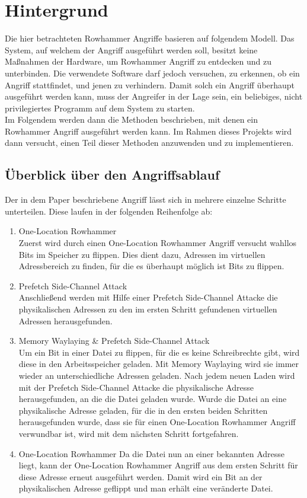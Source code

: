\documentclass[conference]{IEEEtran}
\begin{document}
\section{Hintergrund}\label{sec:background}
Die hier betrachteten Rowhammer Angriffe basieren auf folgendem Modell. Das System, auf welchem der Angriff ausgeführt werden soll, besitzt keine Maßnahmen der Hardware, um Rowhammer Angriff zu entdecken und zu unterbinden. Die verwendete Software darf jedoch versuchen, zu erkennen, ob ein Angriff stattfindet, und jenen zu verhindern. Damit solch ein Angriff überhaupt ausgeführt werden kann, muss der Angreifer in der Lage sein, ein beliebiges, nicht privilegiertes Programm auf dem System zu starten.\\
Im Folgendem werden dann die Methoden beschrieben, mit denen ein Rowhammer Angriff ausgeführt werden kann. Im Rahmen dieses Projekts wird dann versucht, einen Teil dieser Methoden anzuwenden und zu implementieren.
\subsection{Überblick über den Angriffsablauf}
Der in dem Paper beschriebene Angriff lässt sich in mehrere einzelne Schritte unterteilen. Diese laufen in der folgenden Reihenfolge ab:
\begin{enumerate}
	\item One-Location Rowhammer \\
	Zuerst wird durch einen One-Location Rowhammer Angriff versucht wahllos Bits im Speicher zu flippen. Dies dient dazu, Adressen im virtuellen Adressbereich zu finden, für die es überhaupt möglich ist Bits zu flippen.
	
	\item Prefetch Side-Channel Attack \\
	Anschließend werden mit Hilfe einer Prefetch Side-Channel Attacke die physikalischen Adressen zu den im ersten Schritt gefundenen virtuellen Adressen herausgefunden.
	
	\item Memory Waylaying \& Prefetch Side-Channel Attack \\
	Um ein Bit in einer Datei zu flippen, für die es keine Schreibrechte gibt, wird diese in den Arbeitsspeicher geladen. Mit Memory Waylaying wird sie immer wieder an unterschiedliche Adressen geladen. Nach jedem neuen Laden wird mit der Prefetch Side-Channel Attacke die physikalische Adresse herausgefunden, an die die Datei geladen wurde.
	Wurde die Datei an eine physikalische Adresse geladen, für die in den ersten beiden Schritten herausgefunden wurde, dass sie für einen One-Location Rowhammer Angriff verwundbar ist, wird mit dem nächsten Schritt fortgefahren.
	
	\item One-Location Rowhammer
	Da die Datei nun an einer bekannten Adresse liegt, kann der  One-Location Rowhammer Angriff aus dem ersten Schritt für diese Adresse erneut ausgeführt werden. Damit wird ein Bit an der physikalischen Adresse geflippt und man erhält eine veränderte Datei.
\end{enumerate}
\end{document}
